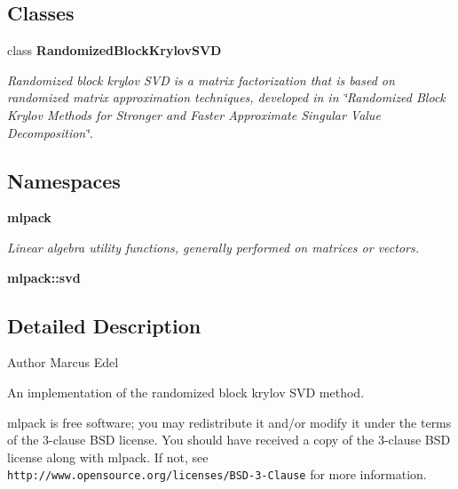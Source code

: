 \subsection*{Classes}
\begin{DoxyCompactItemize}
\item 
class \textbf{ Randomized\+Block\+Krylov\+S\+VD}
\begin{DoxyCompactList}\small\item\em Randomized block krylov S\+VD is a matrix factorization that is based on randomized matrix approximation techniques, developed in in \char`\"{}\+Randomized Block Krylov Methods for Stronger and Faster Approximate
\+Singular Value Decomposition\char`\"{}. \end{DoxyCompactList}\end{DoxyCompactItemize}
\subsection*{Namespaces}
\begin{DoxyCompactItemize}
\item 
 \textbf{ mlpack}
\begin{DoxyCompactList}\small\item\em Linear algebra utility functions, generally performed on matrices or vectors. \end{DoxyCompactList}\item 
 \textbf{ mlpack\+::svd}
\end{DoxyCompactItemize}


\subsection{Detailed Description}
\begin{DoxyAuthor}{Author}
Marcus Edel
\end{DoxyAuthor}
An implementation of the randomized block krylov S\+VD method.

mlpack is free software; you may redistribute it and/or modify it under the terms of the 3-\/clause B\+SD license. You should have received a copy of the 3-\/clause B\+SD license along with mlpack. If not, see {\tt http\+://www.\+opensource.\+org/licenses/\+B\+S\+D-\/3-\/\+Clause} for more information. 